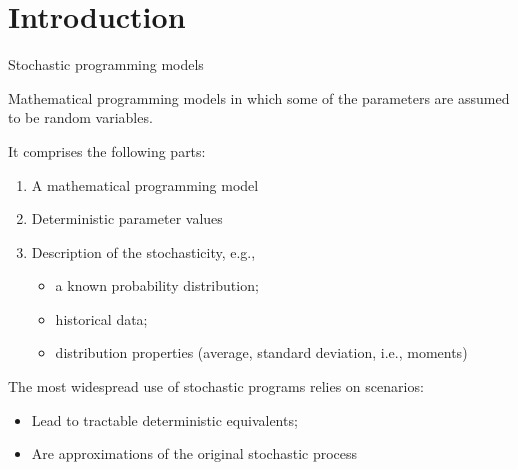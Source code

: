 \section{Introduction}

\begin{frame}{Stochastic programming models}

	Mathematical programming models in which some of the parameters are assumed to be \alert{random variables}.	

	It comprises the following parts:
	\vspace{-6pt}
	\begin{enumerate}
		\item A mathematical programming model
		\item \alert{Deterministic} parameter values	
		\item Description of the \alert{stochasticity}, e.g.,
		\begin{itemize}
			\item a known probability distribution; 
			\item historical data;
			\item distribution properties (average, standard deviation, i.e., moments)	
		\end{itemize}
	\end{enumerate}
	
	\pause
	The most widespread use of stochastic programs relies on \alert{scenarios}:
	\vspace{-6pt}
	\begin{itemize}
		\item Lead to \alert{tractable} deterministic equivalents;
		\item Are \alert{approximations} of the original stochastic process
	\end{itemize}
	
	
	
\end{frame}

